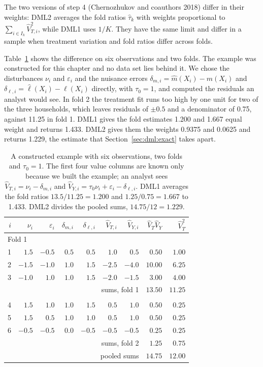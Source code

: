 The two versions of step 4 (Chernozhukov and coauthors 2018) differ in their weights: DML2 averages the fold ratios $\hat\tau_k$ with weights proportional to $\sum_{i \in I_k}\hat V_{T,i}^2$, while DML1 uses $1/K$. They have the same limit and differ in a sample when treatment variation and fold ratios differ across folds.

Table~\ref{tab:dml:six} shows the difference on six observations and two folds. The example was constructed for this chapter and no data set lies behind it. We chose the disturbances $\nu_i$ and $\varepsilon_i$ and the nuisance errors $\delta_{m,i} = \hat m(X_i) - m(X_i)$ and $\delta_{\ell,i} = \hat\ell(X_i) - \ell(X_i)$ directly, with $\tau_0 = 1$, and computed the residuals an analyst would see. In fold 2 the treatment fit runs too high by one unit for two of the three households, which leaves residuals of $\pm 0.5$ and a denominator of 0.75, against 11.25 in fold 1. DML1 gives the fold estimates 1.200 and 1.667 equal weight and returns 1.433. DML2 gives them the weights 0.9375 and 0.0625 and returns 1.229, the estimate that Section~\ref{sec:dml:exact} takes apart.

\begin{table}[ht]
\centering
\caption{A constructed example with six observations, two folds and $\tau_0 = 1$. The first four value columns are known only because we built the example; an analyst sees $\hat V_{T,i} = \nu_i - \delta_{m,i}$ and $\hat V_{Y,i} = \tau_0\nu_i + \varepsilon_i - \delta_{\ell,i}$. DML1 averages the fold ratios $13.5/11.25 = 1.200$ and $1.25/0.75 = 1.667$ to 1.433. DML2 divides the pooled sums, $14.75/12 = 1.229$.}
\label{tab:dml:six}
\footnotesize
\setlength{\tabcolsep}{3pt}
\begin{tabular}{rrrrrrrrr}
\toprule
$i$ & $\nu_i$ & $\varepsilon_i$ & $\delta_{m,i}$ & $\delta_{\ell,i}$ & $\hat V_{T,i}$ & $\hat V_{Y,i}$ & $\hat V_T\hat V_Y$ & $\hat V_T^2$ \\
\midrule
\multicolumn{9}{l}{Fold 1} \\
1 & $1.5$ & $-0.5$ & $0.5$ & $0.5$ & $1.0$ & $0.5$ & $0.50$ & $1.00$ \\
2 & $-1.5$ & $-1.0$ & $1.0$ & $1.5$ & $-2.5$ & $-4.0$ & $10.00$ & $6.25$ \\
3 & $-1.0$ & $1.0$ & $1.0$ & $1.5$ & $-2.0$ & $-1.5$ & $3.00$ & $4.00$ \\
\multicolumn{7}{r}{sums, fold 1} & $13.50$ & $11.25$ \\
\addlinespace
\multicolumn{9}{l}{Fold 2} \\
4 & $1.5$ & $1.0$ & $1.0$ & $1.5$ & $0.5$ & $1.0$ & $0.50$ & $0.25$ \\
5 & $1.5$ & $0.5$ & $1.0$ & $1.0$ & $0.5$ & $1.0$ & $0.50$ & $0.25$ \\
6 & $-0.5$ & $-0.5$ & $0.0$ & $-0.5$ & $-0.5$ & $-0.5$ & $0.25$ & $0.25$ \\
\multicolumn{7}{r}{sums, fold 2} & $1.25$ & $0.75$ \\
\midrule
\multicolumn{7}{r}{pooled sums} & $14.75$ & $12.00$ \\
\bottomrule
\end{tabular}
\end{table}

